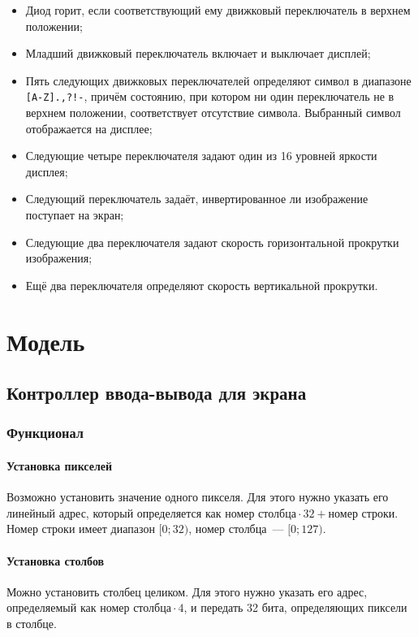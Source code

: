 \documentclass[12pt, a4paper] {ncc}
\begin{document}
\begin{itemize}
        \item Диод горит, если соответствующий ему движковый переключатель в
                верхнем положении;
        \item Младший движковый переключатель включает и выключает дисплей;
        \item Пять следующих движковых переключателей определяют символ в
                диапазоне \texttt{[A-Z].,?!-}, причём состоянию, при котором ни
                один переключатель не в верхнем положении, соответствует
                отсутствие символа. Выбранный символ отображается на дисплее;
        \item Следующие четыре переключателя задают один из 16 уровней яркости
                дисплея;
        \item Следующий переключатель задаёт, инвертированное ли изображение
                поступает на экран;
        \item Следующие два переключателя задают скорость горизонтальной
                прокрутки изображения;
        \item Ещё два переключателя определяют скорость вертикальной прокрутки.
\end{itemize}

\section{Модель}

\subsection{Контроллер ввода-вывода для экрана}

\subsubsection{Функционал}

\paragraph{Установка пикселей} Возможно установить значение одного пикселя. Для
этого нужно указать его линейный адрес, который определяется как $\textit{номер
столбца} \cdot 32 + \textit{номер строки}$. Номер строки имеет диапазон $[0;
32)$, номер столбца~--- $[0; 127)$.

\paragraph{Установка столбов} Можно установить столбец целиком. Для этого нужно
указать его адрес, определяемый как $\textit{номер столбца} \cdot 4$, и
передать 32 бита, определяющих пиксели в столбце.
\end{document}
